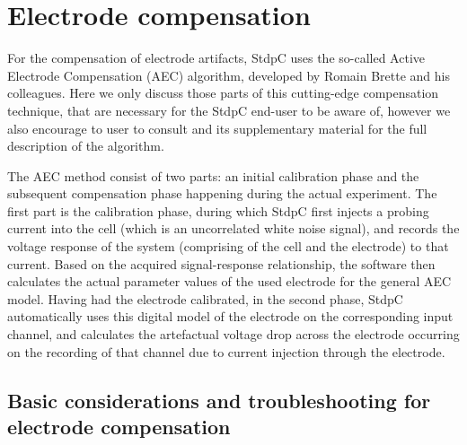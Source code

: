 \documentclass{article}
\begin{document}
\section{Electrode compensation} \label{eleccomp}

For the compensation of electrode artifacts, StdpC uses the so-called Active
Electrode Compensation (AEC) algorithm, developed by Romain Brette and his 
colleagues. Here we only discuss those parts of this cutting-edge
compensation technique, that are necessary for the StdpC end-user to be aware of,
however we also encourage to user to consult \cite{Brette2008} 
and its supplementary material for the full description of the algorithm.

The AEC method consist of two parts: an initial calibration phase and the
subsequent compensation phase happening during the actual experiment. The
first part is the calibration phase, during which StdpC first
injects a probing current into the cell (which is an uncorrelated white noise
signal), and records the voltage response of the system (comprising of
the cell and the electrode) to that current. Based on the
acquired signal-response relationship, the software then calculates the actual parameter
values of the used electrode for the general AEC model. Having had the
electrode calibrated, in the second phase, StdpC automatically uses
this digital model of the electrode on the corresponding input channel, and
calculates the artefactual voltage drop across the electrode occurring on
the recording of that channel due to current injection through the electrode.

\subsection{Basic considerations and troubleshooting for electrode compensation}
\end{document}
